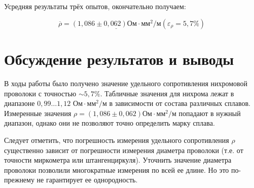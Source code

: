 \documentclass[a4paper,12pt]{article} %
\begin{document}
Усредняя результаты трёх опытов, окончательно получаем:

\begin{equation}
\overline{\rho} = \underline{\left( 1,086 \pm 0,062 \right) \text{Ом} \cdot \text{мм}^2 / \text{м}} \left( \varepsilon_\rho = 5,7 \% \right) 
\end{equation}

\section{Обсуждение результатов и выводы}

В ходы работы было получено значение удельного сопротивления нихромовой проволоки с точностью $ \sim 5,7 \% $. Табличные значения для нихрома лежат в диапазоне $ 0,99 \dots 1,12 \text{ Ом} \cdot \text{мм}^2 / \text{м}$ в зависимости от состава различных сплавов. Измеренные значения $ \rho = \left( 1,086 \pm 0,062 \right) \text{Ом} \cdot \text{мм}^2 / \text{м} $ попадают в нужный диапазон, однако они не позволяют точно определить марку сплава.

\medskip

\noindent Следует отметить, что погрешность измерения удельного сопротивления $ \rho $ существенно зависит от погрешности измерения диаметра проволоки (т.е. от точности миркометра или штангенциркуля).
Уточнить значение диаметра проволоки позволили многократные измерения по всей ее длине. Но это по-прежнему не гарантирует ее однородность.
	
	
	
	
	
	
\end{document}
